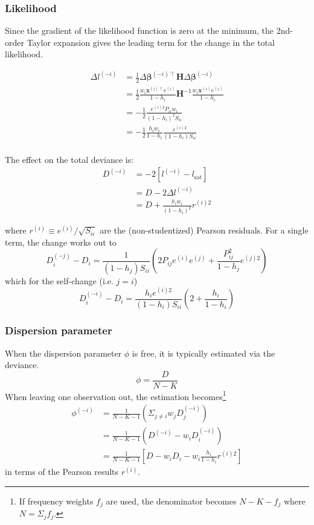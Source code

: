 \documentclass{article}
\newcommand{\bbeta}{\boldsymbol{\beta}}
\begin{document}
\subsubsection{Likelihood}

Since the gradient of the likelihood function is zero at the minimum, the
2nd-order Taylor expansion gives the leading term for the change in the
total likelihood.

\begin{align}
\Delta l^{(-i)} &= \frac{1}{2} \Delta \bbeta^{(-i)\intercal} \mathbf{H} \Delta\bbeta^{(-i)} \\\
&= \frac{1}{2} \frac{w_i \mathbf{x}^{(i)\intercal} e^{(i)}}{1 - h_{i}} \mathbf{H}^{-1} \frac{w_i \mathbf{x}^{(i)} e^{(i)}}{1 - h_{i}} \\\
&= -\frac{1}{2} \frac{e^{(i)2} P_{ii} w_i}{(1-h_i)^2 S_{ii}} \\\
&= -\frac{1}{2} \frac{h_i w_i}{1-h_i} \frac{e^{(i)2}}{(1-h_i)S_{ii}} \\\
\end{align}

The effect on the total deviance is:
\begin{align}
D^{(-i)} &= -2 \left[ l^{(-i)} - l_\textrm{sat} \right] \\\
&= D - 2 \Delta l^{(-i)} \\\
&= D + \frac{h_i w_i}{(1-h_i)^2} r^{(i)2}
\end{align}

where \( r^{(i)} \equiv e^{(i)} / \sqrt{S_{ii}} \) are the (non-studentized) Pearson residuals. For a single term, the change works out to
\[ D_i^{(-j)} - D_i = \frac{1}{(1-h_j)S_{ii}} \left( 2P_{ij} e^{(i)} e^{(j)} + \frac{P_{ij}^2}{1 - h_j} e^{(j)2} \right) \]
which for the self-change (i.e. \( j = i\))
\[ D_i^{(-i)} - D_i = \frac{h_i e^{(i)2}}{(1-h_i)S_{ii}} \left( 2  + \frac{h_i}{1 - h_i}\right) \]

\subsubsection{Dispersion parameter}

When the dispersion parameter \(\phi\) is free, it is typically estimated via the deviance.
\[ \phi = \frac{D}{N - K} \]
When leaving one observation out, the estimation becomes\footnote{If frequency weights $f_j$ are used, the denominator becomes \(N - K - f_j\) where \(N = \Sigma_j f_j\).}
\begin{align}
  \phi^{(-i)} &= \frac{1}{N - K - 1} \left( \Sigma_{j\neq i} w_j D_{j}^{(-i)} \right) \\
              &= \frac{1}{N - K - 1} \left( D^{(-i)} - w_i D_{i}^{(-i)} \right) \\
              &= \frac{1}{N - K - 1} \left[ D - w_i D_i - w_i \frac{h_i}{1-h_i} r^{(i)2} \right]
\end{align}
in terms of the Pearson results $r^{(i)}$.
\end{document}
